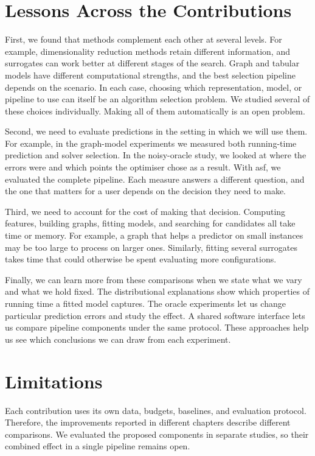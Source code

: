 \section{Lessons Across the Contributions}
\label{sec:ch12:synthesis}

First, we found that methods complement each other at several levels. For example, dimensionality reduction methods retain different information, and surrogates can work better at different stages of the search. Graph and tabular models have different computational strengths, and the best selection pipeline depends on the scenario. In each case, choosing which representation, model, or pipeline to use can itself be an algorithm selection problem. We studied several of these choices individually. Making all of them automatically is an open problem.

Second, we need to evaluate predictions in the setting in which we will use them. For example, in the graph-model experiments we measured both running-time prediction and solver selection. In the noisy-oracle study, we looked at where the errors were and which points the optimiser chose as a result. With \gls{asf}, we evaluated the complete pipeline. Each measure answers a different question, and the one that matters for a user depends on the decision they need to make.

Third, we need to account for the cost of making that decision. Computing features, building graphs, fitting models, and searching for candidates all take time or memory. For example, a graph that helps a predictor on small instances may be too large to process on larger ones. Similarly, fitting several surrogates takes time that could otherwise be spent evaluating more configurations.

Finally, we can learn more from these comparisons when we state what we vary and what we hold fixed. The distributional explanations show which properties of running time a fitted model captures. The oracle experiments let us change particular prediction errors and study the effect. A shared software interface lets us compare pipeline components under the same protocol. These approaches help us see which conclusions we can draw from each experiment.

\section{Limitations}
\label{sec:ch12:limitations}

Each contribution uses its own data, budgets, baselines, and evaluation protocol. Therefore, the improvements reported in different chapters describe different comparisons. We evaluated the proposed components in separate studies, so their combined effect in a single pipeline remains open.

